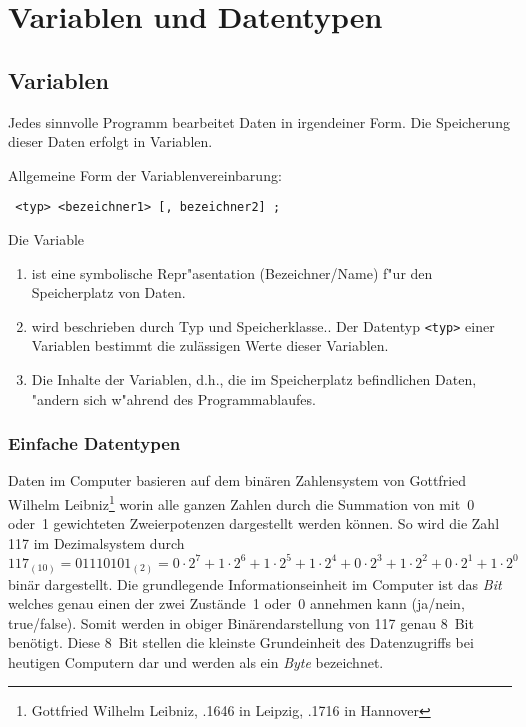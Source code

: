 \chapter{Variablen und Datentypen}
\label{p:2}
%
\section{Variablen}
\label{p:2.1}
Jedes sinnvolle Programm bearbeitet Daten in irgendeiner Form.
Die Speicherung dieser Daten erfolgt in Variablen.

Allgemeine Form der Variablenvereinbarung: \\
\centerline {\texttt {
  <typ> <bezeichner1> [, bezeichner2] ;
}}

\noindent
Die Variable
\begin{minipage}[t] {0.8\textwidth}
 \begin{enumerate}
   \renewcommand {\labelenumi}{\roman{enumi})}
   \item ist eine symbolische Repr"asentation (Bezeichner/Name) f"ur
   	den Speicherplatz von Daten.
   \item  wird beschrieben durch Typ und
   	Speicherklasse..
   	Der Datentyp \texttt{<typ>} einer Variablen bestimmt die zulässigen Werte
   dieser Variablen.
   \item Die Inhalte der Variablen, d.h., die im Speicherplatz befindlichen
   	Daten, "andern sich w"ahrend des Programmablaufes.
 \end{enumerate}
\end{minipage}

%
\subsection{Einfache Datentypen}
\label{p:2.2}
%
Daten im Computer basieren auf dem binären Zahlensystem von
Gottfried Wilhelm Leibniz\footnote{Gottfried Wilhelm Leibniz,
.1646 in Leipzig, .1716 in Hannover}
worin alle ganzen Zahlen durch die Summation von
mit~0 oder~1 gewichteten Zweierpotenzen dargestellt werden können. So wird die Zahl
117 im Dezimalsystem durch
$$ 117_{(10)} =
01110101_{(2)} = 0 \cdot 2^{7} + 1 \cdot 2^{6} + 1 \cdot 2^{5} +
 1 \cdot 2^{4} + 0 \cdot 2^{3} + 1 \cdot 2^{2} + 0 \cdot 2^{1} + 1 \cdot 2^{0}$$
binär dargestellt.
Die grundlegende Informationseinheit im Computer ist das \emph{Bit} welches
genau einen der zwei Zustände~1 oder~0 annehmen kann
(ja/nein, true/false). Somit werden in obiger Binärendarstellung von 117
genau 8~Bit benötigt. Diese 8~Bit stellen die kleinste Grundeinheit des
Datenzugriffs bei heutigen Computern dar und werden als ein \emph{Byte} bezeichnet.

